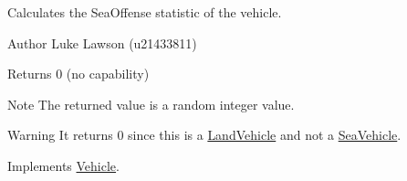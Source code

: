 Calculates the Sea\+Offense statistic of the vehicle. 

\begin{DoxyAuthor}{Author}
Luke Lawson (u21433811) 
\end{DoxyAuthor}
\begin{DoxyReturn}{Returns}
0 (no capability) 
\end{DoxyReturn}
\begin{DoxyNote}{Note}
The returned value is a random integer value. 
\end{DoxyNote}
\begin{DoxyWarning}{Warning}
It returns 0 since this is a \mbox{\hyperlink{class_land_vehicle}{Land\+Vehicle}} and not a \mbox{\hyperlink{class_sea_vehicle}{Sea\+Vehicle}}. 
\end{DoxyWarning}


Implements \mbox{\hyperlink{class_vehicle_ab70b8c0eef30b37648a1ab9903043f47}{Vehicle}}.

